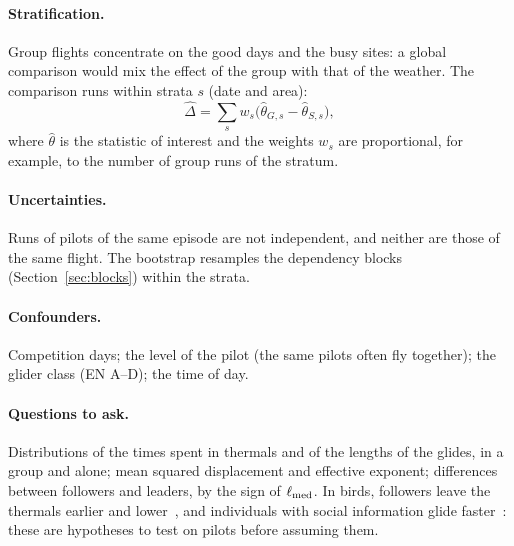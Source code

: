\paragraph{Stratification.} Group flights concentrate on the good days and the busy sites: a
global comparison would mix the effect of the group with that of the weather. The comparison runs
within strata $s$ (date and area):
\begin{equation}\label{eq:strata}
  \hat\Delta=\sum_s w_s\bigl(\hat\theta_{G,s}-\hat\theta_{S,s}\bigr),
\end{equation}
where $\hat\theta$ is the statistic of interest and the weights $w_s$ are proportional, for
example, to the number of group runs of the stratum.

\paragraph{Uncertainties.} Runs of pilots of the same episode are not independent, and neither
are those of the same flight. The bootstrap resamples the dependency blocks
(Section~\ref{sec:blocks}) within the strata.

\paragraph{Confounders.} Competition days; the level of the pilot (the same pilots often fly
together); the glider class (EN A--D); the time of day.

\paragraph{Questions to ask.} Distributions of the times spent in thermals and of the lengths of
the glides, in a group and alone; mean squared displacement and effective exponent; differences
between followers and leaders, by the sign of $\ell_{\rm med}$. In birds, followers leave the
thermals earlier and lower~\cite{flack2018}, and individuals with social information glide
faster~\cite{williams2018}: these are hypotheses to test on pilots before assuming them.
